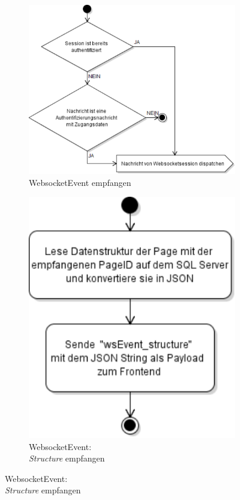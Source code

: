 \begin{figure}[ht]
  \centering
  \begin{subfigure}[b]{0.66222973\textwidth}
    \centering
    \includegraphics[width=\textwidth]{content/hauptteil/systemEntwurf/res/wsHandler/backend/message_received.pdf}
    \caption{WebsocketEvent empfangen}
    \label{fig:aDDB:entry}
  \end{subfigure}
  \hfill
  \begin{subfigure}[b]{0.32777027\textwidth}
    \centering
    \includegraphics[width=\textwidth]{content/hauptteil/systemEntwurf/res/wsHandler/backend/wsEvent_structure.pdf}
    \caption{WebsocketEvent:\\\emph{Structure} empfangen}
    \label{fig:aDDB:wsEvent_structure}
  \end{subfigure}
  \hspace{50mm}


\end{figure}
